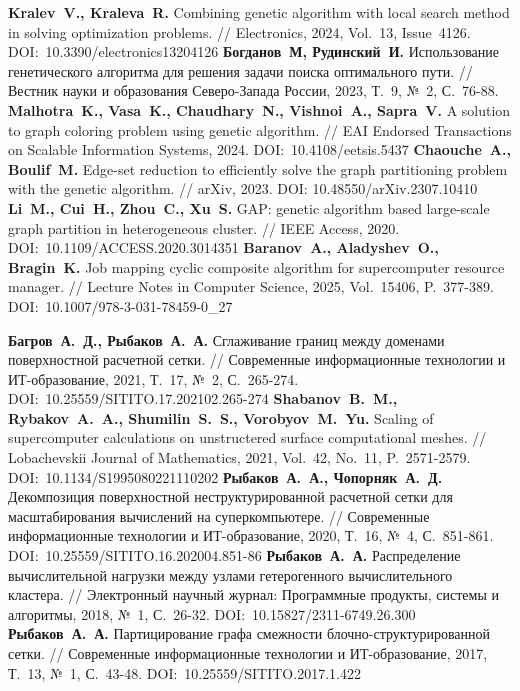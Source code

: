 \begin{thebibliography}{99}
%
\textbf{Kralev~V., Kraleva~R.} Combining genetic algorithm with local search method in solving optimization problems. // Electronics, 2024, Vol.~13, Issue~4126. DOI:~10.3390/electronics13204126
%
\textbf{Богданов~М, Рудинский~И.} Использование генетического алгоритма для решения задачи поиска оптимального пути. // Вестник науки и образования Северо-Запада России, 2023, Т.~9, №~2, С.~76-88.
%
\textbf{Malhotra~K., Vasa~K., Chaudhary~N., Vishnoi~A., Sapra~V.} A solution to graph coloring problem using genetic algorithm. // EAI Endorsed Transactions on Scalable Information Systems, 2024. DOI:~10.4108/eetsis.5437
%
\textbf{Chaouche~A., Boulif~M.} Edge-set reduction to efficiently solve the graph partitioning problem with the genetic algorithm. // arXiv, 2023. DOI: 10.48550/arXiv.2307.10410
%
\textbf{Li~M., Cui~H., Zhou~C., Xu~S.} GAP: genetic algorithm based large-scale graph partition in heterogeneous cluster. // IEEE Access, 2020. DOI:~10.1109/ACCESS.2020.3014351
%
\textbf{Baranov~A., Aladyshev~O., Bragin~K.} Job mapping cyclic composite algorithm for supercomputer resource manager. // Lecture Notes in Computer Science, 2025, Vol.~15406, P.~377-389. DOI:~10.1007/978-3-031-78459-0\_27
%



%
%

%
\textbf{Багров~А.~Д., Рыбаков~А.~А.} Сглаживание границ между доменами поверхностной расчетной сетки. // Современные информационные технологии и ИТ-образование, 2021, Т.~17, №~2, С.~265-274. DOI:~10.25559/SITITO.17.202102.265-274
%
\textbf{Shabanov~B.~M., Rybakov~A.~A., Shumilin~S.~S., Vorobyov~M.~Yu.} Scaling of supercomputer calculations on unstructered surface computational meshes. // Lobachevskii Journal of Mathematics, 2021, Vol.~42, No.~11, P.~2571-2579. DOI:~10.1134/S1995080221110202
%
\textbf{Рыбаков~А.~А., Чопорняк~А.~Д.} Декомпозиция поверхностной неструктурированной расчетной сетки для масштабирования вычислений на суперкомпьютере. // Современные информационные технологии и ИТ-образование, 2020, Т.~16, №~4, С.~851-861. DOI:~10.25559/SITITO.16.202004.851-86
%
\textbf{Рыбаков~А.~А.} Распределение вычислительной нагрузки между узлами гетерогенного вычислительного кластера. // Электронный научный журнал: Программные продукты, системы и алгоритмы, 2018, №~1, С.~26-32. DOI:~10.15827/2311-6749.26.300
%
\textbf{Рыбаков~А.~А.} Партицирование графа смежности блочно-структурированной сетки. // Современные информационные технологии и ИТ-образование, 2017, Т.~13, №~1, С.~43-48. DOI:~10.25559/SITITO.2017.1.422
%



\end{thebibliography}
